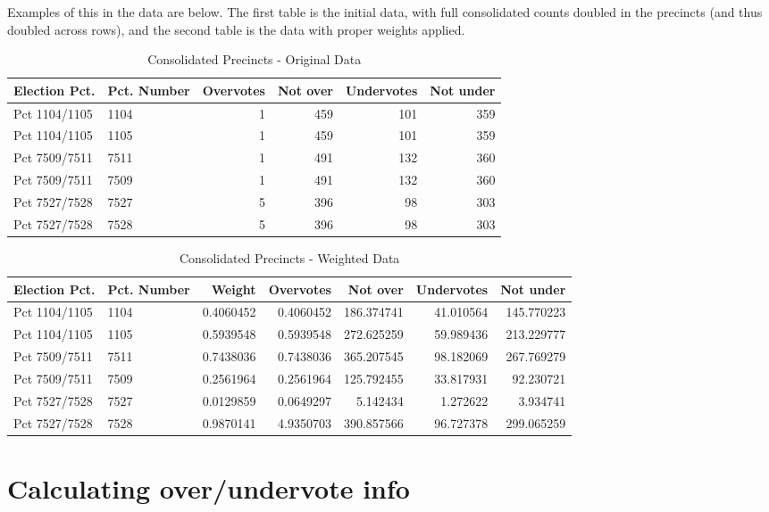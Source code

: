 \documentclass[12pt,twoside]{reedthesis}
\theoremstyle{definition}
\theoremstyle{definition}
\theoremstyle{definition}
\theoremstyle{remark}
\begin{document}
Examples of this in the data are below. The first table is the initial
data, with full consolidated counts doubled in the precincts (and thus
doubled across rows), and the second table is the data with proper
weights applied.
\begin{longtable}[t]{llrrrr}
\caption[Combined Precincts - Original]{\label{tab:unnamed-chunk-8}Consolidated Precincts - Original Data}\\
\toprule
Election Pct. & Pct. Number & Overvotes & Not over & Undervotes & Not under\\
\midrule
Pct 1104/1105 & 1104 & 1 & 459 & 101 & 359\\
Pct 1104/1105 & 1105 & 1 & 459 & 101 & 359\\
Pct 7509/7511 & 7511 & 1 & 491 & 132 & 360\\
Pct 7509/7511 & 7509 & 1 & 491 & 132 & 360\\
Pct 7527/7528 & 7527 & 5 & 396 & 98 & 303\\
Pct 7527/7528 & 7528 & 5 & 396 & 98 & 303\\
\bottomrule
\end{longtable}
\begin{longtable}[t]{llrrrrr}
\caption[Combined Precincts - Weighted]{\label{tab:unnamed-chunk-9}Consolidated Precincts - Weighted Data}\\
\toprule
Election Pct. & Pct. Number & Weight & Overvotes & Not over & Undervotes & Not under\\
\midrule
Pct 1104/1105 & 1104 & 0.4060452 & 0.4060452 & 186.374741 & 41.010564 & 145.770223\\
Pct 1104/1105 & 1105 & 0.5939548 & 0.5939548 & 272.625259 & 59.989436 & 213.229777\\
Pct 7509/7511 & 7511 & 0.7438036 & 0.7438036 & 365.207545 & 98.182069 & 267.769279\\
Pct 7509/7511 & 7509 & 0.2561964 & 0.2561964 & 125.792455 & 33.817931 & 92.230721\\
Pct 7527/7528 & 7527 & 0.0129859 & 0.0649297 & 5.142434 & 1.272622 & 3.934741\\
Pct 7527/7528 & 7528 & 0.9870141 & 4.9350703 & 390.857566 & 96.727378 & 299.065259\\
\bottomrule
\end{longtable}
\hypertarget{calculating-overundervote-info}{%
\section{Calculating over/undervote
info}\label{calculating-overundervote-info}}
\end{document}
